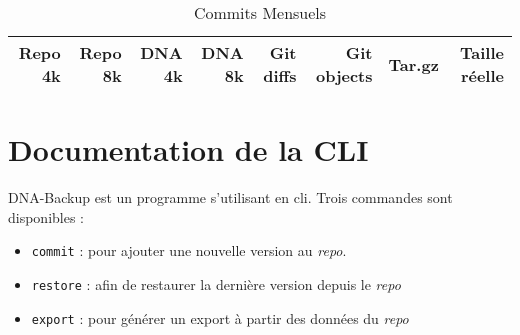\documentclass[a4paper]{report}
\begin{document}
\begin{table*}[ht]
\begin{tabularx}{\textwidth}{RRRRRRRR}
\textbf{Repo 4k} &
\textbf{Repo 8k} &
\textbf{DNA 4k} &
\textbf{DNA 8k} &
\textbf{Git diffs} &
\textbf{Git objects} &
\textbf{Tar.gz} &
\textbf{Taille réelle} \\
\hline

\end{tabularx}
\caption{Commits Mensuels}
\label{tab:commits-monthly}
\end{table*}




\appendix



\chapter{Documentation de la CLI}

DNA-Backup est un programme s'utilisant en \ac{cli}.
Trois commandes sont disponibles :

\begin{itemize}
  \item \verb|commit| : pour ajouter une nouvelle version au \emph{repo}.
  \item \verb|restore| : afin de restaurer la dernière version depuis le \emph{repo}
  \item \verb|export| : pour générer un export à partir des données du \emph{repo}
\end{itemize}
\end{document}
